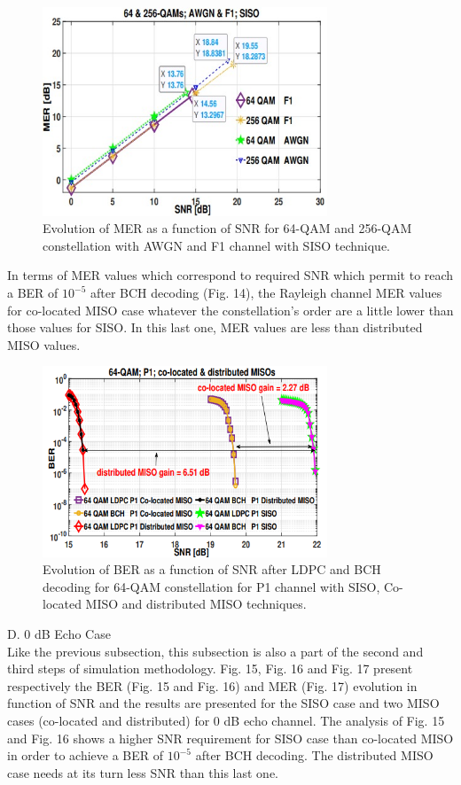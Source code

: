 \documentclass[10pt, conference]{IEEEtran}
\begin{document}
 

\begin{figure}[!htbp]
\centering
    \includegraphics[width=8.5cm]{images/img1.jpg}
    \caption{ Evolution of MER as a function of SNR for 64-QAM and 256-QAM constellation with AWGN and F1 channel with SISO technique.}
\end{figure}
\linespread{1.1}
\normalsize{
In terms of MER values which correspond to required SNR which permit to reach a BER of $10^{-5}$ after BCH decoding (Fig. 14), the Rayleigh channel MER values for co-located MISO case whatever the constellation’s order are a little lower than those values for SISO. In this last one, MER values are less than distributed MISO values.


\begin{figure}[!htbp]
\centering
    \includegraphics[width=8.5cm]{images/img2.png}
    \caption{Evolution of BER as a function of SNR after LDPC and BCH decoding for 64-QAM constellation for P1 channel with SISO, Co-located MISO and distributed MISO techniques.}
\end{figure}


 D. 0 dB Echo Case\\
Like the previous subsection, this subsection is also a part of the second and third steps of simulation methodology. Fig. 15, Fig. 16 and Fig. 17 present respectively the BER (Fig. 15 and Fig. 16) and MER (Fig. 17) evolution in function of SNR and the results are presented for the SISO case and two MISO cases (co-located and distributed) for 0 dB echo channel. The analysis of Fig. 15 and Fig. 16 shows a higher SNR requirement for SISO case than co-located MISO in order to achieve a BER of $10^{-5}$ after BCH decoding. The distributed MISO case needs at its turn less SNR than this last one.
}
\end{document}
